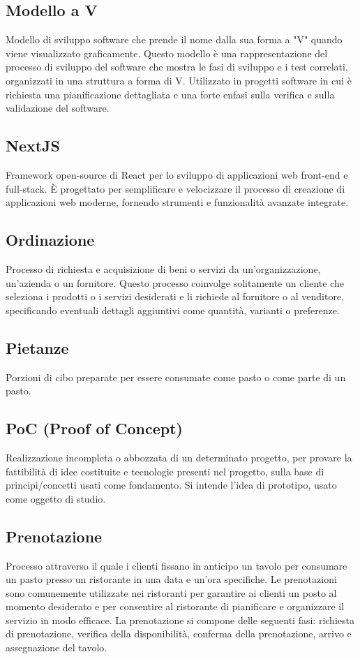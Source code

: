 \subsection{Modello a V}Modello di sviluppo software che prende il nome dalla sua forma a "V" quando viene visualizzato graficamente. Questo modello è una rappresentazione del processo di sviluppo del software che mostra le fasi di sviluppo e i test correlati, organizzati in una struttura a forma di V. Utilizzato in progetti software in cui è richiesta una pianificazione dettagliata e una forte enfasi sulla verifica e sulla validazione del software.
\subsection{NextJS}Framework open-source di React per lo sviluppo di applicazioni web front-end e full-stack. È progettato per semplificare e velocizzare il processo di creazione di applicazioni web moderne, fornendo strumenti e funzionalità avanzate integrate.
\subsection{Ordinazione}Processo di richiesta e acquisizione di beni o servizi da un'organizzazione, un'azienda o un fornitore. Questo processo coinvolge solitamente un cliente che seleziona i prodotti o i servizi desiderati e li richiede al fornitore o al venditore, specificando eventuali dettagli aggiuntivi come quantità, varianti o preferenze.
\subsection{Pietanze}Porzioni di cibo preparate per essere consumate come pasto o come parte di un pasto.
\subsection{PoC (Proof of Concept)}Realizzazione incompleta o abbozzata di un determinato progetto, per provare la fattibilità di idee costituite e tecnologie presenti nel progetto, sulla base di principi/concetti usati come fondamento. Si intende l’idea di prototipo, usato come oggetto di studio.
\subsection{Prenotazione}Processo attraverso il quale i clienti fissano in anticipo un tavolo per consumare un pasto presso un ristorante in una data e un'ora specifiche. Le prenotazioni sono comunemente utilizzate nei ristoranti per garantire ai clienti un posto al momento desiderato e per consentire al ristorante di pianificare e organizzare il servizio in modo efficace. La prenotazione si compone delle seguenti fasi: richiesta di prenotazione, verifica della disponibilità, conferma della prenotazione, arrivo e assegnazione del tavolo.
